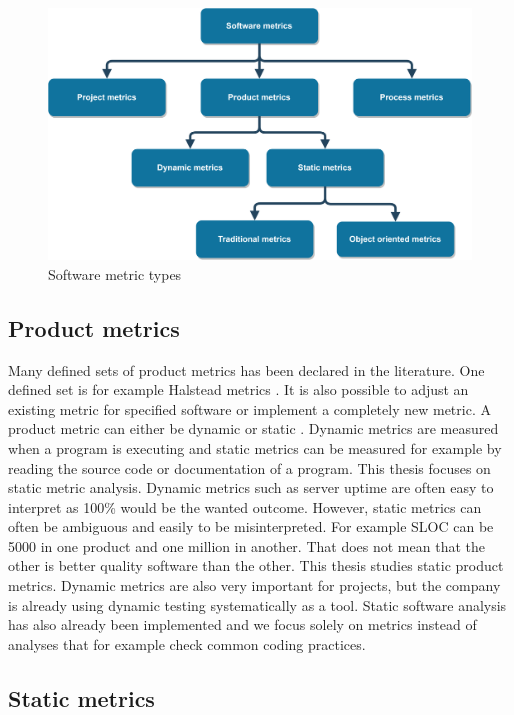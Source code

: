 \begin{figure}[t!]
\centering
\includegraphics[scale=0.05]{metrictree.png}
\caption{Software metric types}
\label{fig:metrictree}
\end{figure}

\subsection{Product metrics}

Many defined sets of product metrics has been declared in the literature. One defined set is for example Halstead metrics \cite{al2005analysis}. It is also possible to adjust an existing metric for specified software or implement a completely new metric. A product metric can either be dynamic or static \cite{sommerville2011software}. Dynamic metrics are measured when a program is executing and static metrics can be measured for example by reading the source code or documentation of a program. This thesis focuses on static metric analysis. Dynamic metrics such as server uptime are often easy to interpret as 100\% would be the wanted outcome. However, static metrics can often be ambiguous and easily to be misinterpreted. For example SLOC can be 5000 in one product and one million in another. That does not mean that the other is better quality software than the other. This thesis studies static product metrics. Dynamic metrics are also very important for projects, but the company is already using dynamic testing systematically as a tool. Static software analysis has also already been implemented and we focus solely on metrics instead of analyses that for example check common coding practices.

\subsection{Static metrics}

